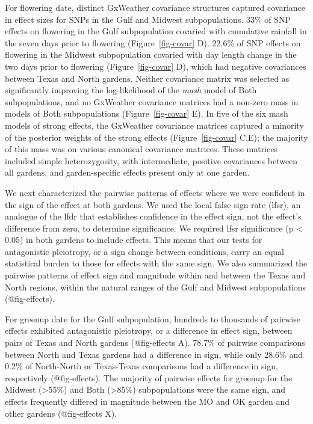 \documentclass[
  9pt,
  twocolumn,
  twoside]{pnas-new}
\begin{document}
For flowering date, distinct GxWeather covariance structures captured
covariance in effect sizes for SNPs in the Gulf and Midwest
subpopulations. 33\% of SNP effects on flowering in the Gulf
subpopulation covaried with cumulative rainfall in the seven days prior
to flowering (Figure~\ref{fig-covar} D). 22.6\% of SNP effects on
flowering in the Midwest subpopulation covaried with day length change
in the two days prior to flowering (Figure~\ref{fig-covar} D), which had
negative covariances between Texas and North gardens. Neither covariance
matrix was selected as significantly improving the log-likelihood of the
\emph{mash} model of Both subpopulations, and no GxWeather covariance
matrices had a non-zero mass in models of Both subpopulations
(Figure~\ref{fig-covar} E). In five of the six mash models of strong
effects, the GxWeather covariance matrices captured a minority of the
posterior weights of the strong effects (Figure~\ref{fig-covar} C,E);
the majority of this mass was on various canonical covariance matrices.
These matrices included simple heterozygosity, with intermediate,
positive covariances between all gardens, and garden-specific effects
present only at one garden.

We next characterized the pairwise patterns of effects where we were
confident in the sign of the effect at both gardens. We used the local
false sign rate (lfsr), an analogue of the lfdr that establishes
confidence in the effect sign, not the effect's difference from zero, to
determine significance. We required lfsr significance (p \textless{}
0.05) in both gardens to include effects. This means that our tests for
antagonistic pleiotropy, or a sign change between conditions, carry an
equal statistical burden to those for effects with the same sign. We
also summarized the pairwise patterns of effect sign and magnitude
within and between the Texas and North regions, within the natural
ranges of the Gulf and Midwest subpopulations (@fig-effects).

For greenup date for the Gulf subpopulation, hundreds to thousands of
pairwise effects exhibited antagonistic pleiotropy, or a difference in
effect sign, between pairs of Texas and North gardens (@fig-effects A).
78.7\% of pairwise comparisons between North and Texas gardens had a
difference in sign, while only 28.6\% and 0.2\% of North-North or
Texas-Texas comparisons had a difference in sign, respectively
(@fig-effects). The majority of pairwise effects for greenup for the
Midwest (\textgreater55\%) and Both (\textgreater85\%) subpopulations
were the same sign, and effects frequently differed in magnitude between
the MO and OK garden and other gardens (@fig-effects X).
\end{document}
